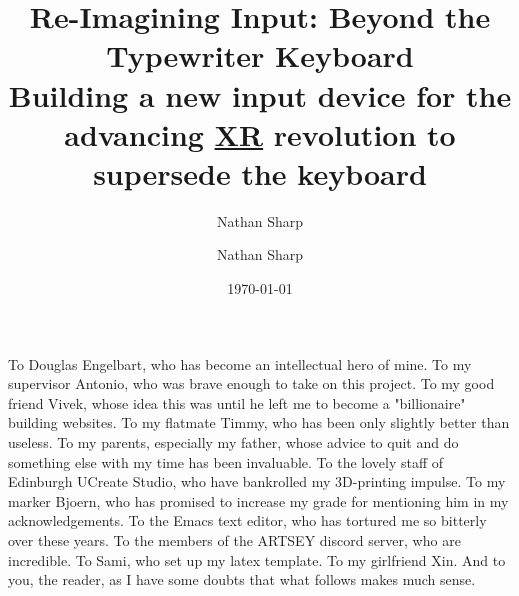 \documentclass[logo,bsc,singlespacing,parskip]{infthesis}
\author{Nathan Sharp}
\date{\today}
\title{Re-Imagining Input: Beyond the Typewriter Keyboard\\\medskip
\large Building a new input device for the advancing \hyperref[orgf7f8e78]{XR} revolution to supersede the keyboard}
\begin{document}
\begin{preliminary}
\author{Nathan Sharp}

\newenvironment{ethics}
  {\begin{frontenv}{Research Ethics Approval}{\LARGE}}
  {\end{frontenv}\newpage}


\maketitle

\begin{acknowledgements}
To Douglas Engelbart, who has become an intellectual hero of mine.
To my supervisor Antonio, who was brave enough to take on this project.
To my good friend Vivek, whose idea this was until he left me to become a "billionaire" building websites.
To my flatmate Timmy, who has been only slightly better than useless.
To my parents, especially my father, whose advice to quit and do something else with my time has been invaluable.
To the lovely staff of Edinburgh UCreate Studio, who have bankrolled my 3D-printing impulse.
To my marker Bjoern, who has promised to increase my grade for mentioning him in my acknowledgements.
To the Emacs text editor, who has tortured me so bitterly over these years.
To the members of the ARTSEY discord server, who are incredible.
To Sami, who set up my latex template.
To my girlfriend Xin.
And to you, the reader, as I have some doubts that what follows makes much sense.
\end{acknowledgements}


\end{preliminary}
\end{document}
